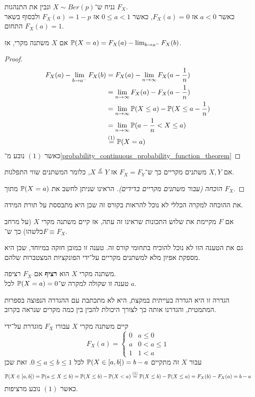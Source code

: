 \begin{example}
	נניח ש־$X \sim Ber(p)$ ונבין את התנהגות $F_X$. \\
	כאשר $a < 0$ אז $F_X(a) = 0$, כאשר $0 \le a < 1$ אז $F_X(a) = 1 - p$ ולבסוף בשאר התחום $F_X(a) = 1$.
\end{example}
\begin{proposition}
	אם $X$ משתנה מקרי, אז $\mathbb{P}(X = a) = F_X(a) - \lim_{b \to a^-} F_X(b)$.
\end{proposition}
\begin{proof}
	\begin{align*}
		F_X(a) - \lim_{b \to a^-} F_X(b)
		& = F_X(a) - \lim_{n \to \infty} F_X(a - \frac{1}{n}) \\
		& = \lim_{n \to \infty} F_X(a) - F_X(a - \frac{1}{n}) \\
		& = \lim_{n \to \infty} \mathbb{P}(X \le a) - \mathbb{P}(X \le a - \frac{1}{n}) \\
		& = \lim_{n \to \infty} \mathbb{P}(a - \frac{1}{n} < X \le a) \\
		& \overset{(1)}{=} \mathbb{P}(X = a)
	\end{align*}
	כאשר $(1)$ נובע מ־\ref{probability_continuous_probability_function_theorem}
\end{proof}
\begin{proposition}
	אם $X, Y$ משתנים מקריים כך ש־$F_X = F_Y$ אז $X \overset{d}{=} Y$, כלומר המשתנים שווי התפלגות.
\end{proposition}
\begin{proof}[הוכחה (עבור משתנים מקריים בדידים)]
	הראינו שניתן לחשב את $\mathbb{P}(X = a)$ מתוך $F_X$.
\end{proof}
את ההוכחה למקרה הכללי לא נוכל להראות בקורס זה שכן היא מתבססת על תורת המידה.
\begin{proposition}
	אם $F$ מקיימת את שלוש התכונות שראינו זה עתה, אז קיים משתנה מקרי $X$ (על מרחב כלשהו) כך ש־$F \equiv F_X$.
\end{proposition}
גם את הטענה הזו לא נוכל להוכיח בתחומי קורס זה.
טענה זו כמובן חזקה במיוחד, שכן היא מספקת אפיון מלא למשתנים מקריים על־ידי הפונקציות המצטברות שלהם.
\begin{definition}
	משתנה מקרי $X$ הוא \textbf{רציף} אם $F_X$ רציפה. \\
	טענה זו שקולה למקרה ש־$\mathbb{P}(X = a) = 0$ לכל $a$.
\end{definition}
הגדרה זו היא הגדרה בעייתית במקצת, היא לא מתכתבת עם ההגדרה הנפוצה בספרות המתמטית, והגדרנו אותה כך לצורך היכולת להבין בין כמה מקרים שנראה בקרוב.
\begin{example}
	קיים משתנה מקרי $X$ עבורו $F_X$ מוגדרת על־ידי
	\[
		F_X(a) = \begin{cases}
			0 & a \le 0 \\
			a & 0 < a \le 1 \\
			1 & 1 < a
		\end{cases}
	\]
	עבור $X$ זה מתקיים $\mathbb{P}(X \in [a, b]) = b - a$ לכל $0 \le a \le b \le 1$.
	זאת שכן
	\[
		\mathbb{P}(X \in [a, b])
		= \mathbb{P}(a \le X \le b)
		= \mathbb{P}(X \le b) - \mathbb{P}(X < a)
		\overset{(1)}{=} \mathbb{P}(X \le b) - \mathbb{P}(X \le a)
		= F_X(b) - F_X(a)
		= b - a
	\]
	כאשר $(1)$ נובע מרציפות.
\end{example}
